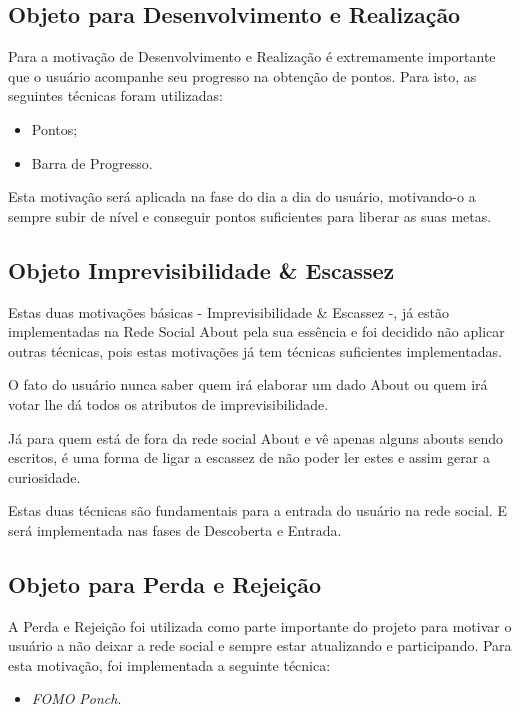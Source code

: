 \subsection{Objeto para Desenvolvimento e Realização}
\label{sub:objeto_desenvolvimento_e_realizacao}
Para a motivação de Desenvolvimento e Realização é extremamente importante  que o usuário acompanhe seu progresso
na obtenção de pontos. Para isto, as seguintes técnicas foram utilizadas:

\begin{itemize}
    \item Pontos;
    \item Barra de Progresso.
\end{itemize}

Esta motivação será aplicada na fase do dia a dia do usuário, motivando-o a sempre subir de nível
e conseguir pontos suficientes para liberar as suas metas.

\subsection{Objeto Imprevisibilidade \& Escassez}
\label{sub:objeto_imprevisibilidade}
Estas duas motivações básicas - Imprevisibilidade \& Escassez -,  já estão implementadas na Rede Social About pela sua essência e foi
decidido não aplicar outras técnicas, pois estas motivações já tem técnicas suficientes implementadas.

O fato do usuário nunca saber quem irá elaborar um dado About ou quem irá votar lhe dá
todos os atributos de imprevisibilidade. 

Já para quem está de fora da rede social About e vê apenas alguns abouts sendo escritos, é uma forma
de ligar a escassez de não poder ler estes e assim gerar a curiosidade.

Estas duas técnicas são fundamentais para a entrada do usuário na rede social. E será implementada
nas fases de Descoberta e Entrada.

\subsection{Objeto para Perda e Rejeição}
\label{sub:objeto_perda_rejeicao}
A Perda e Rejeição foi utilizada como parte importante do projeto para motivar o usuário a não deixar a rede
social e sempre estar atualizando e participando. Para esta motivação, foi implementada a seguinte técnica:

\begin{itemize}
    \item \textit{FOMO} \textit{Ponch}.
\end{itemize}

